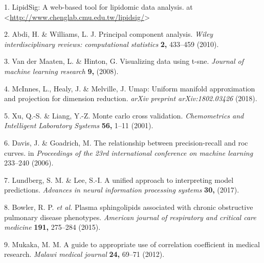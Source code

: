 \documentclass[]{article}
\begin{document}
\hypertarget{refs}{}
\leavevmode\hypertarget{ref-lipidsig}{}%
1. LipidSig: A web-based tool for lipidomic data analysis. at \textless{}\url{http://www.chenglab.cmu.edu.tw/lipidsig/}\textgreater{}

\leavevmode\hypertarget{ref-abdi2010principal}{}%
2. Abdi, H. \& Williams, L. J. Principal component analysis. \emph{Wiley interdisciplinary reviews: computational statistics} \textbf{2,} 433--459 (2010).

\leavevmode\hypertarget{ref-van2008visualizing}{}%
3. Van der Maaten, L. \& Hinton, G. Visualizing data using t-sne. \emph{Journal of machine learning research} \textbf{9,} (2008).

\leavevmode\hypertarget{ref-mcinnes2018umap}{}%
4. McInnes, L., Healy, J. \& Melville, J. Umap: Uniform manifold approximation and projection for dimension reduction. \emph{arXiv preprint arXiv:1802.03426} (2018).

\leavevmode\hypertarget{ref-xu2001monte}{}%
5. Xu, Q.-S. \& Liang, Y.-Z. Monte carlo cross validation. \emph{Chemometrics and Intelligent Laboratory Systems} \textbf{56,} 1--11 (2001).

\leavevmode\hypertarget{ref-davis2006relationship}{}%
6. Davis, J. \& Goadrich, M. The relationship between precision-recall and roc curves. in \emph{Proceedings of the 23rd international conference on machine learning} 233--240 (2006).

\leavevmode\hypertarget{ref-lundberg2017unified}{}%
7. Lundberg, S. M. \& Lee, S.-I. A unified approach to interpreting model predictions. \emph{Advances in neural information processing systems} \textbf{30,} (2017).

\leavevmode\hypertarget{ref-bowler2015plasma}{}%
8. Bowler, R. P. \emph{et al.} Plasma sphingolipids associated with chronic obstructive pulmonary disease phenotypes. \emph{American journal of respiratory and critical care medicine} \textbf{191,} 275--284 (2015).

\leavevmode\hypertarget{ref-mukaka2012guide}{}%
9. Mukaka, M. M. A guide to appropriate use of correlation coefficient in medical research. \emph{Malawi medical journal} \textbf{24,} 69--71 (2012).
\end{document}
